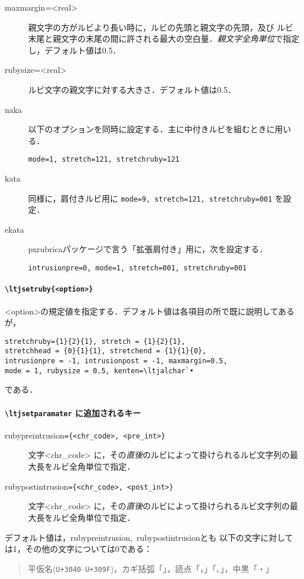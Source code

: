 \documentclass[b5paper,10pt]{ltjsarticle}
\begin{document}
\begin{description}
\item[maxmargin=<real>] 親文字の方がルビより長い時に，ルビの先頭と親文字の先頭，及び
ルビ末尾と親文字の末尾の間に許される最大の空白量．\emph{親文字全角単位}で指定し，デフォルト値は0.5．
\item[rubysize=<real>] ルビ文字の親文字に対する大きさ．デフォルト値は0.5．

\medskip
\item[naka] 以下のオプションを同時に設定する．主に中付きルビを組むときに用いる．
\begin{verbatim}
mode=1, stretch=121, stretchruby=121
\end{verbatim}
\item[kata] 同様に，肩付きルビ用に \verb+mode=9, stretch=121, stretchruby=001+ を設定．
\item[ekata] pxrubricaパッケージで言う「拡張肩付き」用に，次を設定する．
\begin{verbatim}
intrusionpre=0, mode=1, stretch=001, stretchruby=001
\end{verbatim}
\end{description}
\paragraph{\tt\textbackslash ltjsetruby\{<option>\}}
<option>の規定値を指定する．デフォルト値は各項目の所で既に説明してあるが，
\begin{verbatim}
stretchruby={1}{2}{1}, stretch = {1}{2}{1},
stretchhead = {0}{1}{1}, stretchend = {1}{1}{0},
intrusionpre = -1, intrusionpost = -1, maxmargin=0.5, 
mode = 1, rubysize = 0.5, kenten=\ltjalchar`•
\end{verbatim}
である．

\paragraph{\texttt{\textbackslash ltjsetparamater} に追加されるキー}
\begin{description}
\item[\textsf{rubypreintrusion}\tt =\{<chr\_code>, <pre\_int>\}]
文字<chr\_code> に，その\emph{直後}のルビによって掛けられるルビ文字列の最大長をルビ全角単位で指定．
\item[\textsf{rubypostintrusion}\tt =\{<chr\_code>, <post\_int>\}]
文字<chr\_code> に，その\emph{直後}のルビによって掛けられるルビ文字列の最大長をルビ全角単位で指定．
\end{description} 
デフォルト値は，\textsf{rubypreintrusion},~\textsf{rubypostintrusion}とも
以下の文字に対しては1，その他の文字については0である：
\begin{quote}
 平仮名(\texttt{U+3040}--\texttt{U+309F})，カギ括弧「」，読点「，」「、」，中黒「・」
\end{quote}
\end{document}
